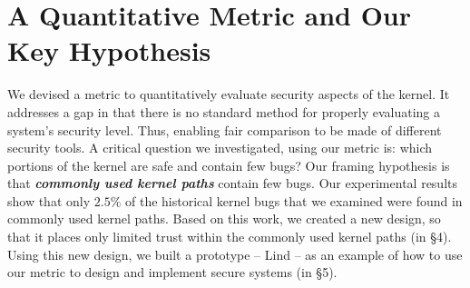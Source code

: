 \section{A Quantitative Metric and Our Key Hypothesis}
\label{sec.metric}
We devised a metric to quantitatively evaluate security aspects of the kernel. 
It addresses a gap in that there is no standard method for properly evaluating 
a system's security level. Thus, enabling fair comparison to be made of different security tools. 
A critical question we investigated, using our metric is: which portions of the kernel are safe and 
contain few bugs? Our framing hypothesis is that \textbf{\textit{commonly used kernel paths}} contain few bugs. 
Our experimental results show that only $2.5\%$ of the historical kernel bugs that we examined were 
found in commonly used kernel paths. Based on this work, we created a new design, so that it 
places only limited trust within the commonly used kernel paths (in \S{4}). Using this new design, we built a prototype 
-- Lind -- as an example of how to use our metric to design and implement secure systems (in \S{5}). 


